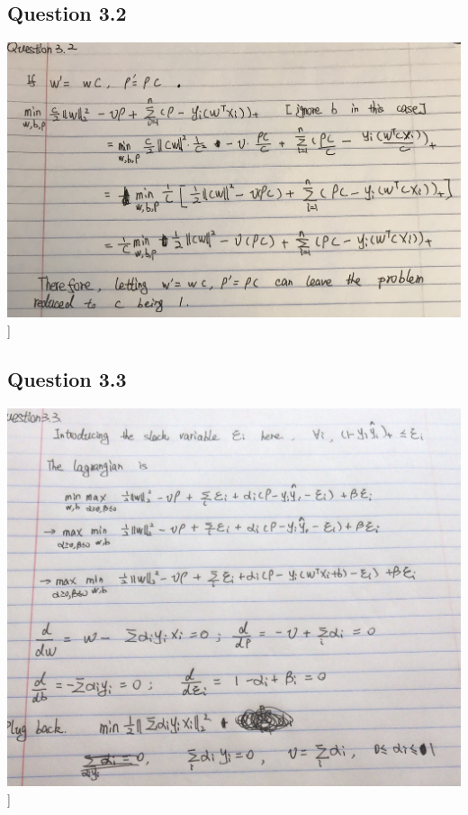 \documentclass[11pt]{article} %
\begin{document}
\subsection{Question 3.2}
\includegraphics[scale=0.15]{q32.jpeg}]

\subsection{Question 3.3}
\includegraphics[scale=0.45]{q33.JPG}]
\end{document}
